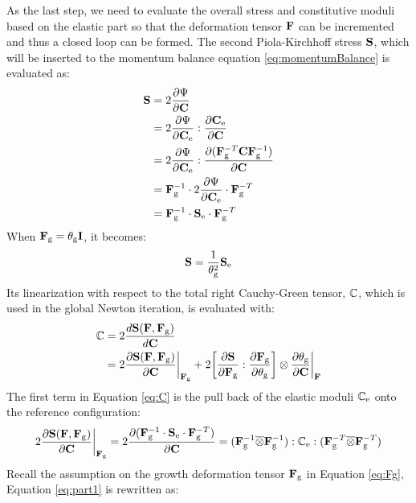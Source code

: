 As the last step, we need to evaluate the overall stress and constitutive moduli based on the elastic part so that the deformation tensor $\bold{F}$ can be incremented and thus a closed loop can be formed. The second Piola-Kirchhoff stress $\bold{S}$, which will be inserted to the momentum balance equation \ref{eq:momentumBalance} is evaluated as:
\begin{equation}
\begin{split}
\bold{S} &= 2\frac{\partial \Psi}{\partial \bold{C}} \\
	&= 2\frac{\partial \Psi}{\partial \bold{C}_{\mathrm{e}}} : \frac{\partial \bold{C}_{\mathrm{e}}}{\partial \bold{C}}  \\
	&= 2\frac{\partial \Psi}{\partial \bold{C}_{\mathrm{e}}} : \frac{\partial(\bold{F}_{\mathrm{g}}^{-T} \bold{C} \bold{F}_{\mathrm{g}}^{-1})}
	{\partial \bold{C}} \\
	&=  \bold{F}_{\mathrm{g}}^{-1} \cdot 2\frac{\partial \Psi}{\partial \bold{C}_{\mathrm{e}}} \cdot \bold{F}_{\mathrm{g}}^{-T} \\
	&= \bold{F}_{\mathrm{g}}^{-1} \cdot \bold{S}_{\mathrm{e}} \cdot \bold{F}_{\mathrm{g}}^{-T}
\end{split}
\end{equation}
When $\bold{F}_{\mathrm{g}} = \theta_{\mathrm{g}} \bold{I}$, it becomes:
\begin{equation} \label{eq:S}
\bold{S} = \frac{1}{\theta_{\mathrm{g}}^{2}} \bold{S}_{\mathrm{e}}
\end{equation}
Its linearization with respect to the total right Cauchy-Green tensor, $\mathbb{C}$, which is used in the global Newton iteration, is evaluated with:
\begin{equation} \label{eq:C}
\begin{split}
\mathbb{C} &= 2\frac{d\bold{S}(\bold{F}, \bold{F}_{\mathrm{g}})}{d\bold{C}} \\
	&= 2\frac{\partial\bold{S}(\bold{F}, \bold{F}_{\mathrm{g}})}{\partial\bold{C}}\bigg|_{\bold{F}_{\mathrm{g}}} + 2\bigg[ \frac{\partial\bold{S}}{\partial\bold{F}_{\mathrm{g}}} : \frac{\partial\bold{F}_{\mathrm{g}}}{\partial\theta_{\mathrm{g}}} \bigg]\otimes \frac{\partial\theta_{\mathrm{g}}}{\partial\bold{C}}\bigg|_{\bold{F}}
\end{split}
\end{equation}
The first term in Equation \ref{eq:C} is the pull back of the elastic moduli $\mathbb{C}_{\mathrm{e}}$ onto the reference configuration:
\begin{equation} \label{eq:part1}
2\frac{\partial\bold{S}(\bold{F}, \bold{F}_{\mathrm{g}})}{\partial\bold{C}}\bigg|_{\bold{F}_{\mathrm{g}}} = 2\frac{\partial (\bold{F}_{\mathrm{g}}^{-1} \cdot \bold{S}_{\mathrm{e}} \cdot \bold{F}_{\mathrm{g}}^{-T})}{\partial \bold{C}} = (\bold{F}_{\mathrm{g}}^{-1} \overline\otimes \bold{F}_{\mathrm{g}}^{-1}) : \mathbb{C}_{\mathrm{e}} : (\bold{F}_{\mathrm{g}}^{-T} \overline\otimes \bold{F}_{\mathrm{g}}^{-T})
\end{equation}
Recall the assumption on the growth deformation tensor $\bold{F}_{\mathrm{g}}$ in Equation \ref{eq:Fg}, Equation \ref{eq:part1} is rewritten as:
